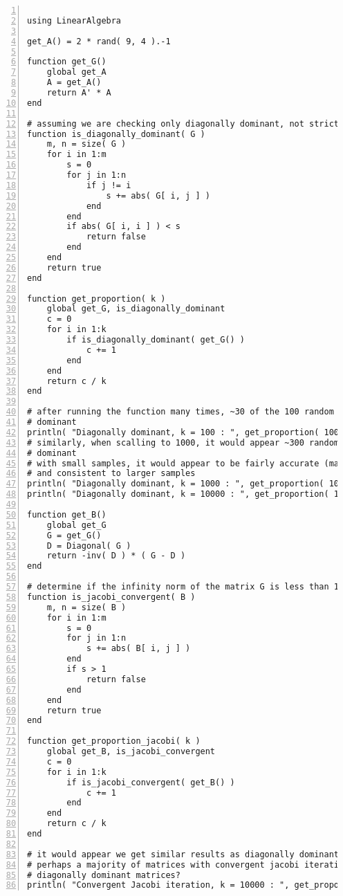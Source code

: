 \documentclass[ 12pt ]{article}
\begin{document}
\begin{lstlisting}[basicstyle=\ttfamily\footnotesize, numbers=left, tabsize=4]

using LinearAlgebra

get_A() = 2 * rand( 9, 4 ).-1

function get_G()
	global get_A
	A = get_A()
	return A' * A
end

# assuming we are checking only diagonally dominant, not strictly diagonally dominant
function is_diagonally_dominant( G )
	m, n = size( G )
	for i in 1:m
		s = 0
		for j in 1:n
			if j != i
				s += abs( G[ i, j ] )
			end
		end
		if abs( G[ i, i ] ) < s
			return false
		end
	end
	return true
end

function get_proportion( k )
	global get_G, is_diagonally_dominant
	c = 0
	for i in 1:k
		if is_diagonally_dominant( get_G() )
			c += 1
		end
	end
	return c / k
end

# after running the function many times, ~30 of the 100 random matrices are diagonally
# dominant
println( "Diagonally dominant, k = 100 : ", get_proportion( 100   ) )
# similarly, when scalling to 1000, it would appear ~300 random matrices are diagonally
# dominant
# with small samples, it would appear to be fairly accurate (maybe error roughly < 0.05)
# and consistent to larger samples
println( "Diagonally dominant, k = 1000 : ", get_proportion( 1000 ) )
println( "Diagonally dominant, k = 10000 : ", get_proportion( 10000 ) )

function get_B()
	global get_G
	G = get_G()
	D = Diagonal( G )
	return -inv( D ) * ( G - D )
end

# determine if the infinity norm of the matrix G is less than 1
function is_jacobi_convergent( B )
	m, n = size( B )
	for i in 1:m
		s = 0
		for j in 1:n
			s += abs( B[ i, j ] )
		end
		if s > 1
			return false
		end
	end
	return true
end

function get_proportion_jacobi( k )
	global get_B, is_jacobi_convergent
	c = 0
	for i in 1:k
		if is_jacobi_convergent( get_B() )
			c += 1
		end
	end
	return c / k
end

# it would appear we get similar results as diagonally dominant matrices.
# perhaps a majority of matrices with convergent jacobi iterations come from strictly
# diagonally dominant matrices?
println( "Convergent Jacobi iteration, k = 10000 : ", get_proportion_jacobi( 10000 ) )

\end{lstlisting}
\end{document}
